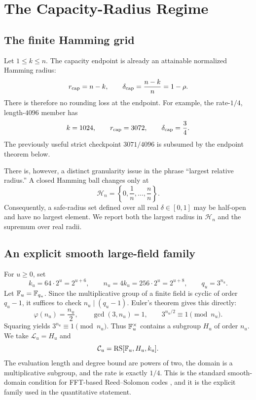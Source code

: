 \section{The Capacity-Radius Regime}

\subsection{The finite Hamming grid}

Let \(1\le k\le n\).  The capacity endpoint is already an attainable
normalized Hamming radius:
\[
  r_{\mathrm{cap}}=n-k,
  \qquad
  \delta_{\mathrm{cap}}=\frac{n-k}{n}=1-\rho.
\]
There is therefore no rounding loss at the endpoint.  For example, the
rate-\(1/4\), length-\(4096\) member has
\[
  k=1024,\qquad r_{\mathrm{cap}}=3072,\qquad
  \delta_{\mathrm{cap}}=\frac34.
\]
The previously useful strict checkpoint \(3071/4096\) is subsumed by the
endpoint theorem below.

There is, however, a distinct granularity issue in the phrase ``largest
relative radius.''  A closed Hamming ball changes only at
\[
  \mathcal H_n=\left\{0,\frac1n,\ldots,\frac nn\right\}.
\]
Consequently, a safe-radius set defined over all real
\(\delta\in[0,1]\) may be half-open and have no largest element.  We report
both the largest radius in \(\mathcal H_n\) and the supremum over real radii.

\subsection{An explicit smooth large-field family}
\label{sec:explicit-family}

For \(u\ge0\), set
\[
  k_u=64\cdot2^u=2^{u+6},
  \qquad
  n_u=4k_u=256\cdot2^u=2^{u+8},
  \qquad
  q_u=3^{n_u}.
\]
Let \(\mathbb{F}_u=\mathbb F_{q_u}\).  Since the multiplicative group of a finite
field is cyclic of order \(q_u-1\), it suffices to check
\(n_u\mid(q_u-1)\).  Euler's theorem gives this directly:
\[
  \varphi(n_u)=\frac{n_u}{2},
  \qquad
  \gcd(3,n_u)=1,
  \qquad
  3^{n_u/2}\equiv1\pmod{n_u}.
\]
Squaring yields \(3^{n_u}\equiv1\pmod{n_u}\).  Thus
\(\mathbb{F}_u^\times\) contains a subgroup \(H_u\) of order \(n_u\).  We take
\(\mathcal L_u=H_u\) and
\[
  \mathcal C_u=\operatorname{RS}[\mathbb{F}_u,H_u,k_u].
\]
The evaluation length and degree bound are powers of two, the domain is a
multiplicative subgroup, and the rate is exactly \(1/4\).  This is the
standard smooth-domain condition for FFT-based Reed--Solomon codes
\cite{arnonChiesaFenziYogev2024}, and it is the explicit family used in the
quantitative statement.

